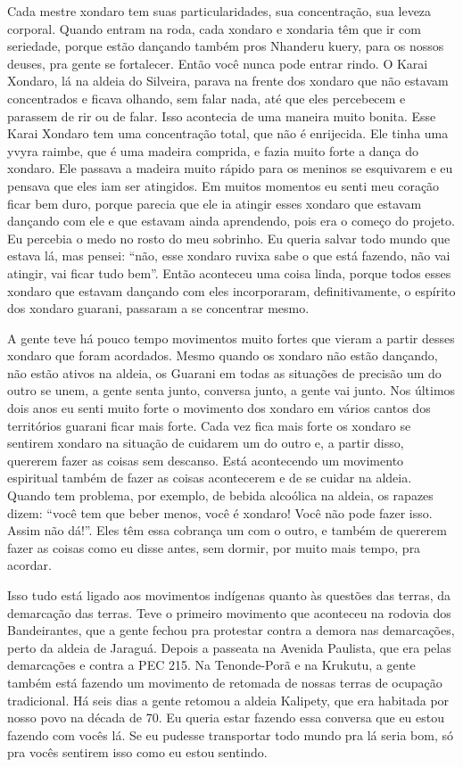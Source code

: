 Cada mestre xondaro tem suas particularidades, sua concentração, sua
leveza corporal. Quando entram na roda, cada xondaro e xondaria têm que
ir com seriedade, porque estão dançando também pros Nhanderu kuery, para
os nossos deuses, pra gente se fortalecer. Então você nunca pode entrar
rindo. O Karai Xondaro, lá na aldeia do Silveira, parava na frente dos
xondaro que não estavam concentrados e ficava olhando, sem falar nada,
até que eles percebecem e parassem de rir ou de falar. Isso acontecia
de uma maneira muito bonita. Esse Karai Xondaro tem uma concentração
total, que não é enrijecida. Ele tinha uma yvyra raimbe, que é uma
madeira comprida, e fazia muito forte a dança do xondaro. Ele passava a
madeira muito rápido para os meninos se esquivarem e eu pensava que
eles iam ser atingidos. Em muitos momentos eu senti meu coração ficar
bem duro, porque parecia que ele ia atingir esses xondaro que estavam
dançando com ele e que estavam ainda aprendendo, pois era o começo do
projeto. Eu percebia o medo no rosto do meu sobrinho. Eu queria salvar
todo mundo que estava lá, mas pensei: ``não, esse xondaro ruvixa sabe o
que está fazendo, não vai atingir, vai ficar tudo bem''. Então aconteceu
uma coisa linda, porque todos esses xondaro que estavam dançando com
eles incorporaram, definitivamente, o espírito dos xondaro guarani,
passaram a se concentrar mesmo.

A gente teve há pouco tempo movimentos muito fortes que vieram a partir
desses xondaro que foram acordados. Mesmo quando os xondaro não estão
dançando, não estão ativos na aldeia, os Guarani em todas as situações
de precisão um do outro se unem, a gente senta junto, conversa junto, a
gente vai junto. Nos últimos dois anos eu senti muito forte o movimento
dos xondaro em vários cantos dos territórios guarani ficar mais forte.
Cada vez fica mais forte os xondaro se sentirem xondaro na situação de
cuidarem um do outro e, a partir disso, quererem fazer as coisas sem
descanso. Está acontecendo um movimento espiritual também de fazer as
coisas acontecerem e de se cuidar na aldeia. Quando tem problema, por
exemplo, de bebida alcoólica na aldeia, os rapazes dizem: ``você tem que
beber menos, você é xondaro! Você não pode fazer isso. Assim não dá!''.
Eles têm essa cobrança um com o outro, e também de quererem fazer as
coisas como eu disse antes, sem dormir, por muito mais tempo, pra
acordar.

Isso tudo está ligado aos movimentos indígenas quanto às questões das
terras, da demarcação das terras. Teve o primeiro movimento que
aconteceu na rodovia dos Bandeirantes, que a gente fechou pra protestar
contra a demora nas demarcações, perto da aldeia de Jaraguá. Depois a
passeata na Avenida Paulista, que era pelas demarcações e contra a PEC
215. Na Tenonde-Porã e na Krukutu, a gente também está fazendo um
movimento de retomada de nossas terras de ocupação tradicional. Há seis
dias a gente retomou a aldeia Kalipety, que era habitada por nosso povo
na década de 70. Eu queria estar fazendo essa conversa que eu estou
fazendo com vocês lá. Se eu pudesse transportar todo mundo pra lá seria
bom, só pra vocês sentirem isso como eu estou sentindo.

